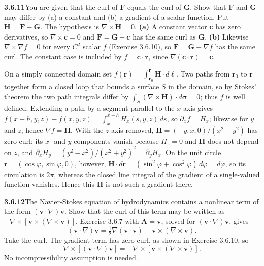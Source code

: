 \par\bigskip
\noindent\textbf{3.6.11}\quad You are given that the curl of $\mathbf{F}$
equals the curl of $\mathbf{G}$. Show that $\mathbf{F}$ and $\mathbf{G}$ may
differ by (a) a constant and (b) a gradient of a scalar function.
\solution
Put $\mathbf H=\mathbf F-\mathbf G$. The hypothesis is
$\nabla\times\mathbf H=0$.
\textbf{(a)} A constant vector $\mathbf c$ has zero derivatives, so
$\nabla\times\mathbf c=0$ and
$\mathbf F=\mathbf G+\mathbf c$ has the same curl as $\mathbf G$.
\textbf{(b)} Likewise $\nabla\times\nabla f=0$ for every $C^2$ scalar
$f$ (Exercise 3.6.10), so
$\mathbf F=\mathbf G+\nabla f$ has the same curl.
The constant case is included by $f=\mathbf c\cdot\mathbf r$, since
$\nabla(\mathbf c\cdot\mathbf r)=\mathbf c$.

On a simply connected domain set
$f(\mathbf r)=\int_{\mathbf r_0}^{\mathbf r}\mathbf H\cdot d\boldsymbol\ell$.
Two paths from $\mathbf r_0$ to $\mathbf r$ together form a closed loop
that bounds a surface $S$ in the domain, so by Stokes' theorem the two
path integrals differ by
$\int_S(\nabla\times\mathbf H)\cdot d\boldsymbol\sigma=0$; thus $f$ is
well defined. Extending a path by a segment parallel to the $x$-axis
gives $f(x+h,y,z)-f(x,y,z)=\int_x^{x+h}H_x(s,y,z)\,ds$, so
$\partial_xf=H_x$; likewise for $y$ and $z$, hence $\nabla f=\mathbf H$.
With the $z$-axis removed, $\mathbf H=(-y,x,0)/(x^2+y^2)$ has zero curl:
its $x$- and $y$-components vanish because $H_z=0$ and $\mathbf H$ does
not depend on $z$, and
$\partial_xH_y=(y^2-x^2)/(x^2+y^2)^2=\partial_yH_x$.
On the unit circle $\mathbf r=(\cos\varphi,\sin\varphi,0)$, however,
$\mathbf H\cdot d\mathbf r=(\sin^2\varphi+\cos^2\varphi)\,d\varphi
=d\varphi$, so its circulation is $2\pi$, whereas the closed line
integral of the gradient of a single-valued function vanishes. Hence
this $\mathbf H$ is not such a gradient there.

\par\bigskip
\noindent\textbf{3.6.12}\quad The Navier-Stokes equation of hydrodynamics
contains a nonlinear term of the form $(\mathbf{v}\cdot\nabla)\mathbf{v}$.
Show that the curl of this term may be written as
$-\nabla\times[\mathbf{v}\times(\nabla\times\mathbf{v})]$.
\solution
Exercise 3.6.7 with $\mathbf A=\mathbf v$, solved for
$(\mathbf v\cdot\nabla)\mathbf v$, gives
\[
(\mathbf v\cdot\nabla)\mathbf v
=\tfrac12\nabla(\mathbf v\cdot\mathbf v)
-\mathbf v\times(\nabla\times\mathbf v).
\]
Take the curl. The gradient term has zero curl, as shown in
Exercise 3.6.10, so
\[
\boxed{\nabla\times[(\mathbf v\cdot\nabla)\mathbf v]
=-\nabla\times[\mathbf v\times(\nabla\times\mathbf v)]}.
\]
No incompressibility assumption is needed.

